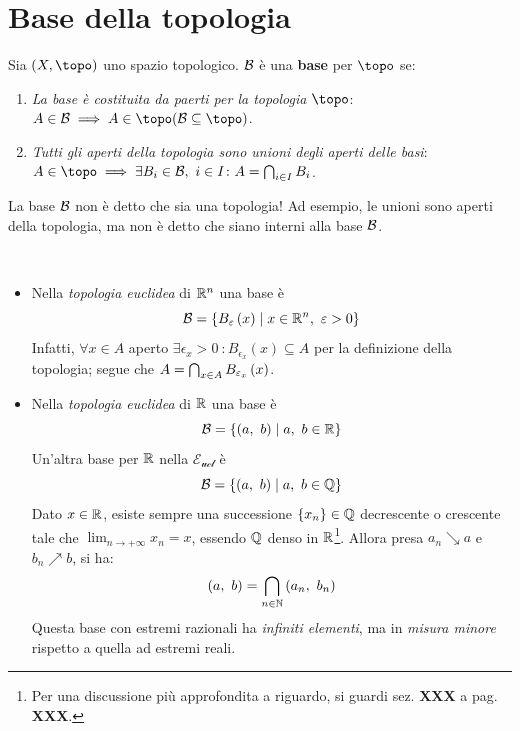 \section{Base della topologia}
\begin{define}
Sia $\left(X, \topo\right)$ uno spazio topologico. $\mathcal{B}$ è una \textbf{base} per $\topo$ se:
\begin{enumerate}
\item \textit{La base è costituita da paerti per la topologia $\topo$}: $A\in\basis\implies A\in\topo (\basis\subseteq\topo)$.
\item \textit{Tutti gli aperti della topologia sono unioni degli aperti delle basi}:
$A\in\topo\implies\exists B_i\in\basis,\ i\in I\colon A=\union_{i\in I}B_i$.
\end{enumerate}
\end{define}
\begin{attention}
La base $\mathcal{B}$ non è detto che sia una topologia! Ad esempio, le unioni sono aperti della topologia, ma non è detto che siano interni alla base $\mathcal{B}$.
\end{attention}
\begin{example}~{}
\begin{itemize}
\item Nella \textit{topologia euclidea} di $\mathbb{R}^n$ una base è
\begin{equation}
\mathcal{B}=\left\{B_{\varepsilon}\left(x\right)\mid x\in\mathbb{R}^n,\ \varepsilon>0\right\}
\end{equation}
Infatti, $\forall x\in A$ aperto $\exists\epsilon_x>0\ \colon B_{\epsilon_x}\left(x\right)\subseteq A$ per la definizione della topologia; segue che $A=\mathop{{\bigcap}}\displaylimits_{x\in A}B_{\varepsilon_x}\left(x\right)$.
\item Nella \textit{topologia euclidea} di $\mathbb{R}$ una base è
\begin{equation}
	\mathcal{B}=\left\{\left(a,\ b\right)\mid a,\ b\in \mathbb{R}\right\}
\end{equation}
Un'altra base per $\mathbb{R}$ nella $\mathcal{E_{ucl}}$ è 
\begin{equation*}
	\basis=\left\{\left(a,\ b\right)\mid a,\ b\in \rationalset\right\}
\end{equation*}
Dato $x\in\mathbb{R}$, esiste sempre una successione $\left\{x_n\right\}\in\mathbb{Q}$ decrescente o crescente tale che $\displaystyle\lim_{n \to +\infty}x_n=x$, essendo $\mathbb{Q}$ denso in $\mathbb{R}$\footnote{Per una discussione più approfondita a riguardo, si guardi sez. \textbf{XXX} a pag. \textbf{XXX}.}. Allora presa $a_n\searrow a$ e $b_n\nearrow b$, si ha:
\begin{equation*}
\left(a,\ b\right)=\mathop{{\bigcap}}\displaylimits_{n\in \mathbb{N}}\left(a_n,\ b_n\right)
\end{equation*}
Questa base con estremi razionali ha \textit{infiniti elementi}, ma in \textit{misura minore} rispetto a quella ad estremi reali.
\end{itemize}
\end{example}
